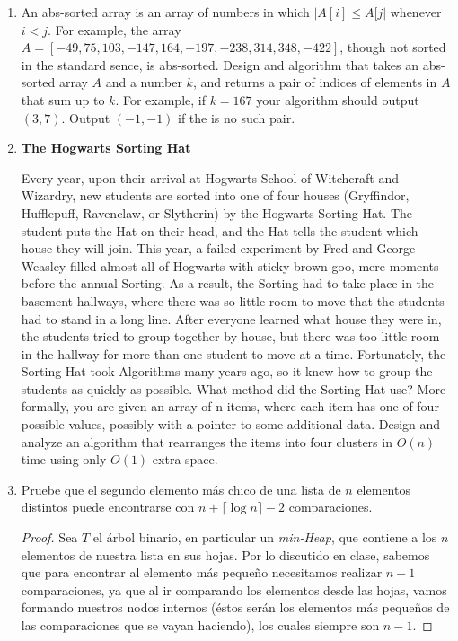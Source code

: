 \documentclass[letterpaper,11pt]{article}
\begin{document}
\begin{enumerate}
    \item An abs-sorted array is an array of numbers in which $|A[i] \leq A[j|$
    whenever $i < j$. For example, the array $A = [-49, 75, 103, -147, 164, -197,
    -238, 314, 348, -422]$, though not sorted in the standard sence, is 
    abs-sorted. Design and algorithm that takes an abs-sorted array $A$ and a 
    number $k$, and returns a pair of indices of elements in $A$ that sum up to 
    $k$. For example, if $k = 167$ your algorithm should output $(3, 7)$. Output 
    $(-1, -1)$ if the is no such pair.

    \item \textbf{The Hogwarts Sorting Hat}

    Every year, upon their arrival at Hogwarts School of Witchcraft and Wizardry, 
    new students are sorted into one of four houses (Gryffindor, Hufflepuff, 
    Ravenclaw, or Slytherin) by the Hogwarts Sorting Hat. The student puts the 
    Hat on their head, and the Hat tells the student which house they will join. 
    This year, a failed experiment by Fred and George Weasley filled almost all 
    of Hogwarts with sticky brown goo, mere moments before the annual Sorting. 
    As a result, the Sorting had to take place in the basement hallways, where 
    there was so little room to move that the students had to stand in a long 
    line. After everyone learned what house they were in, the students tried to 
    group together by house, but there was too little room in the hallway for 
    more than one student to move at a time. Fortunately, the Sorting Hat took 
    Algorithms many years ago, so it knew how to group the students as quickly 
    as possible. What method did the Sorting Hat use? More formally, you are 
    given an array of n items, where each item has one of four possible values, 
    possibly with a pointer to some additional data. Design and analyze an 
    algorithm that rearranges the items into four clusters in $O(n)$ time 
    using only $O(1)$ extra space.

    \newpage
    \item Pruebe que el segundo elemento más chico de una lista de $n$ elementos 
    distintos puede encontrarse con $n + \lceil \log n \rceil - 2$ comparaciones.

    \begin{proof}
        Sea $T$ el árbol binario, en particular un \textit{min-Heap}, que 
        contiene a los $n$ elementos de nuestra lista en sus hojas. Por lo 
        discutido en clase, sabemos que para encontrar al elemento más pequeño 
        necesitamos realizar $n-1$ comparaciones, ya que al ir comparando los 
        elementos desde las hojas, vamos formando nuestros nodos internos (éstos 
        serán los elementos más pequeños de las comparaciones que se vayan 
        haciendo), los cuales siempre son $n-1$.


\end{proof}
\end{enumerate}
\end{document}
